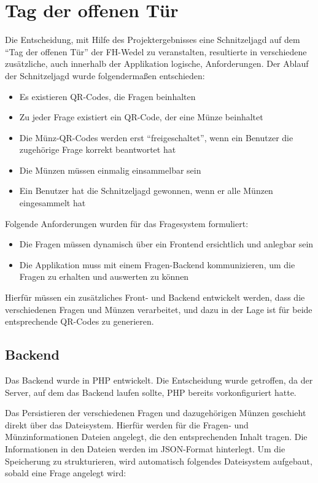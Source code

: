\chapter{Tag der offenen Tür}

Die Entscheidung, mit Hilfe des Projektergebnisses eine Schnitzeljagd auf dem “Tag der offenen Tür” der FH-Wedel zu veranstalten, resultierte in verschiedene zusätzliche, auch innerhalb der Applikation logische, Anforderungen.
Der Ablauf der Schnitzeljagd wurde folgendermaßen entschieden:

\begin{itemize}
\item Es existieren QR-Codes, die Fragen beinhalten
\item Zu jeder Frage existiert ein QR-Code, der eine Münze beinhaltet
\item Die Münz-QR-Codes werden erst “freigeschaltet”, wenn ein Benutzer die zugehörige Frage korrekt beantwortet hat
\item Die Münzen müssen einmalig einsammelbar sein
\item Ein Benutzer hat die Schnitzeljagd gewonnen, wenn er alle Münzen eingesammelt hat
\end{itemize}
Folgende Anforderungen wurden für das Fragesystem formuliert:

\begin{itemize}
\item Die Fragen müssen dynamisch über ein Frontend ersichtlich und anlegbar sein
\item Die Applikation muss mit einem Fragen-Backend kommunizieren, um die Fragen zu erhalten und auswerten zu können
\end{itemize}

Hierfür müssen ein zusätzliches Front- und Backend entwickelt werden, dass die verschiedenen Fragen und Münzen verarbeitet, und dazu in der Lage ist für beide entsprechende QR-Codes zu generieren.

\section{Backend}
Das Backend wurde in PHP entwickelt. Die Entscheidung wurde getroffen, da der Server, auf dem das Backend laufen sollte, PHP bereits vorkonfiguriert hatte.

Das Persistieren der verschiedenen Fragen und dazugehörigen Münzen geschieht direkt über das Dateisystem. Hierfür werden für die Fragen- und Münzinformationen Dateien angelegt, die den entsprechenden Inhalt tragen. Die Informationen in den Dateien werden im JSON-Format hinterlegt.
Um die Speicherung zu strukturieren, wird automatisch folgendes Dateisystem aufgebaut, sobald eine Frage angelegt wird:

